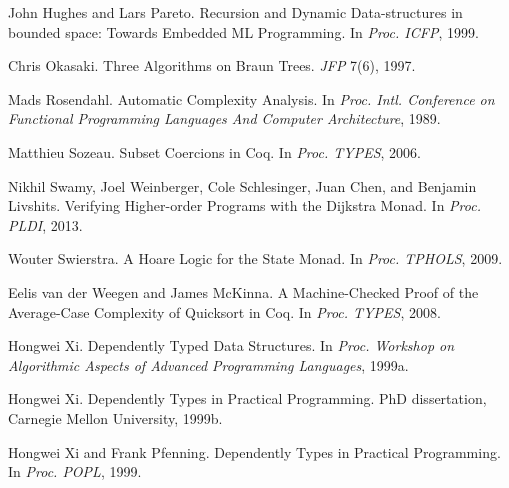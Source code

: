\documentclass{llncs}
\newcommand{\postDoc}{}
\newenvironment{SingleColumn}{\begin{list}{}{\topsep=0pt\partopsep=0pt%
\listparindent=0pt\itemindent=0pt\labelwidth=0pt\leftmargin=0pt\rightmargin=0pt%
\itemsep=0pt\parsep=0pt}\item}{\end{list}}
\newenvironment{AutoBibliography}{\begin{small}}{\end{small}}
\newcommand{\Autobibentry}[1]{\hspace{0.05\linewidth}\parbox[t]{0.95\linewidth}{\parindent=-0.05\linewidth#1\vspace{1.0ex}}}
\begin{document}
\begin{AutoBibliography}
\begin{SingleColumn}
\label{t:x28autobib_x22John_Hughes_and_Lars_ParetoRecursion_and_Dynamic_Datax2dstructures_in_bounded_spacex3a_Towards_Embedded_ML_ProgrammingIn_Procx2e_ICFP1999x22x29}\Autobibentry{John Hughes and Lars Pareto. Recursion and Dynamic Data{-}structures in bounded space: Towards Embedded ML Programming. In \textit{Proc. ICFP}, 1999.}

\label{t:x28autobib_x22Chris_OkasakiThree_Algorithms_on_Braun_TreesJFP_7x286x291997x22x29}\Autobibentry{Chris Okasaki. Three Algorithms on Braun Trees. \textit{JFP} 7(6), 1997.}

\label{t:x28autobib_x22Mads_RosendahlAutomatic_Complexity_AnalysisIn_Procx2e_Intlx2e_Conference_on_Functional_Programming_Languages_And_Computer_Architecture1989x22x29}\Autobibentry{Mads Rosendahl. Automatic Complexity Analysis. In \textit{Proc. Intl. Conference on Functional Programming Languages And Computer Architecture}, 1989.}

\label{t:x28autobib_x22Matthieu_SozeauSubset_Coercions_in_CoqIn_Procx2e_TYPES2006x22x29}\Autobibentry{Matthieu Sozeau. Subset Coercions in Coq. In \textit{Proc. TYPES}, 2006.}

\label{t:x28autobib_x22Nikhil_Swamyx2c_Joel_Weinbergerx2c_Cole_Schlesingerx2c_Juan_Chenx2c_and_Benjamin_LivshitsVerifying_Higherx2dorder_Programs_with_the_Dijkstra_MonadIn_Procx2e_PLDI2013x22x29}\Autobibentry{Nikhil Swamy, Joel Weinberger, Cole Schlesinger, Juan Chen, and Benjamin Livshits. Verifying Higher{-}order Programs with the Dijkstra Monad. In \textit{Proc. PLDI}, 2013.}

\label{t:x28autobib_x22Wouter_SwierstraA_Hoare_Logic_for_the_State_MonadIn_Procx2e_TPHOLS2009x22x29}\Autobibentry{Wouter Swierstra. A Hoare Logic for the State Monad. In \textit{Proc. TPHOLS}, 2009.}

\label{t:x28autobib_x22Eelis_van_der_Weegen_and_James_McKinnaA_Machinex2dChecked_Proof_of_the_Averagex2dCase_Complexity_of_Quicksort_in_CoqIn_Procx2e_TYPES2008x22x29}\Autobibentry{Eelis van der Weegen and James McKinna. A Machine{-}Checked Proof of the Average{-}Case Complexity of Quicksort in Coq. In \textit{Proc. TYPES}, 2008.}

\label{t:x28autobib_x22Hongwei_XiDependently_Typed_Data_StructuresIn_Procx2e_Workshop_on_Algorithmic_Aspects_of_Advanced_Programming_Languages1999x22x29}\Autobibentry{Hongwei Xi. Dependently Typed Data Structures. In \textit{Proc. Workshop on Algorithmic Aspects of Advanced Programming Languages}, 1999a.}

\label{t:x28autobib_x22Hongwei_XiDependently_Types_in_Practical_ProgrammingPhD_dissertationx2c_Carnegie_Mellon_University1999x22x29}\Autobibentry{Hongwei Xi. Dependently Types in Practical Programming. PhD dissertation, Carnegie Mellon University, 1999b.}

\label{t:x28autobib_x22Hongwei_Xi_and_Frank_PfenningDependently_Types_in_Practical_ProgrammingIn_Procx2e_POPL1999x22x29}\Autobibentry{Hongwei Xi and Frank Pfenning. Dependently Types in Practical Programming. In \textit{Proc. POPL}, 1999.}\end{SingleColumn}\end{AutoBibliography}

\postDoc
\end{document}
